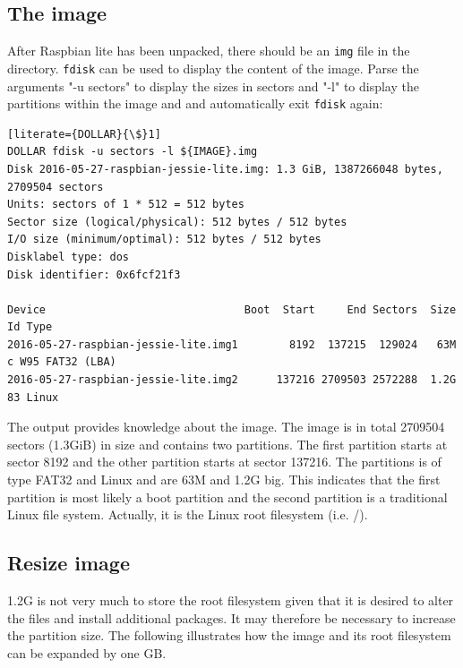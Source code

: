 
\subsection{The image}

After Raspbian lite has been unpacked, there should be an \texttt{img} file in the directory.
\texttt{fdisk} can be used to display the content of the image. Parse the arguments
"-u sectors" to display the sizes in sectors and "-l" to display the partitions within the
image and and automatically exit \texttt{fdisk} again:

\begin{lstlisting}[literate={DOLLAR}{\$}1]
DOLLAR fdisk -u sectors -l ${IMAGE}.img
Disk 2016-05-27-raspbian-jessie-lite.img: 1.3 GiB, 1387266048 bytes, 2709504 sectors
Units: sectors of 1 * 512 = 512 bytes
Sector size (logical/physical): 512 bytes / 512 bytes
I/O size (minimum/optimal): 512 bytes / 512 bytes
Disklabel type: dos
Disk identifier: 0x6fcf21f3

Device                               Boot  Start     End Sectors  Size Id Type
2016-05-27-raspbian-jessie-lite.img1        8192  137215  129024   63M  c W95 FAT32 (LBA)
2016-05-27-raspbian-jessie-lite.img2      137216 2709503 2572288  1.2G 83 Linux
\end{lstlisting}
\FloatBarrier

The output provides knowledge about the image. The image is in total
2709504 sectors (1.3GiB) in size and contains two
partitions. The first partition starts at sector 8192 and
the other partition starts at sector 137216. The partitions is of type FAT32
and Linux and are 63M and 1.2G big. This indicates that the first partition
is most likely a boot partition and the second partition is a traditional Linux file
system. Actually, it is the Linux root filesystem (i.e. /).

\subsection{Resize image}
1.2G is not very much to store the root filesystem given that it is desired to
alter the files and install additional packages. It may therefore be
necessary to increase the partition size.
The following illustrates how the image and its root filesystem
can be expanded by one \ac{GB}.

